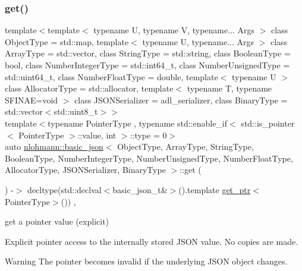 \subsubsection{\texorpdfstring{get()}{get()}\hspace{0.1cm}{\footnotesize\ttfamily [2/2]}}
{\footnotesize\ttfamily template$<$template$<$ typename U, typename V, typename... Args $>$ class Object\+Type = std\+::map, template$<$ typename U, typename... Args $>$ class Array\+Type = std\+::vector, class String\+Type  = std\+::string, class Boolean\+Type  = bool, class Number\+Integer\+Type  = std\+::int64\+\_\+t, class Number\+Unsigned\+Type  = std\+::uint64\+\_\+t, class Number\+Float\+Type  = double, template$<$ typename U $>$ class Allocator\+Type = std\+::allocator, template$<$ typename T, typename S\+F\+I\+N\+A\+E=void $>$ class J\+S\+O\+N\+Serializer = adl\+\_\+serializer, class Binary\+Type  = std\+::vector$<$std\+::uint8\+\_\+t$>$$>$ \\
template$<$typename Pointer\+Type , typename std\+::enable\+\_\+if$<$ std\+::is\+\_\+pointer$<$ Pointer\+Type $>$\+::value, int $>$\+::type  = 0$>$ \\
auto \hyperlink{classnlohmann_1_1basic__json}{nlohmann\+::basic\+\_\+json}$<$ Object\+Type, Array\+Type, String\+Type, Boolean\+Type, Number\+Integer\+Type, Number\+Unsigned\+Type, Number\+Float\+Type, Allocator\+Type, J\+S\+O\+N\+Serializer, Binary\+Type $>$\+::get (\begin{DoxyParamCaption}{ }\end{DoxyParamCaption}) -\/$>$ decltype(std\+::declval$<$basic\+\_\+json\+\_\+t\&$>$().template \hyperlink{classnlohmann_1_1basic__json_ac3698ce827dcd4f0c81455461709938d}{get\+\_\+ptr}$<$Pointer\+Type$>$())
    \hspace{0.3cm}{\ttfamily [inline]}, {\ttfamily [noexcept]}}



get a pointer value (explicit) 

Explicit pointer access to the internally stored J\+S\+ON value. No copies are made.

\begin{DoxyWarning}{Warning}
The pointer becomes invalid if the underlying J\+S\+ON object changes.
\end{DoxyWarning}

